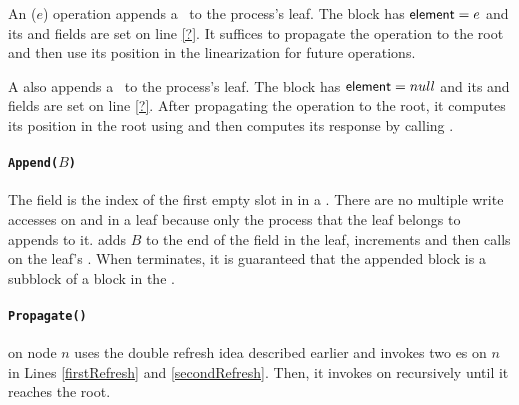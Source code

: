 An ($e$) operation appends a \block\ to the process's leaf.
The block has $\mbox{\sf element}=e$ and its  and  fields are set
on line \ref{?}.
It suffices to propagate the operation to the root and
then use its position in the linearization for future 
operations.

A  also appends a \block\ to the process's leaf.
The block has $\mbox{\sf element}=null$ and its  and  fields are set
on line \ref{?}.
After propagating the operation to the root, it computes
its position in the root using
 and then computes its response by calling . 

\paragraph{\tt{Append($B$)}}
The  field is the index of the first empty slot in
 in a . There are no multiple write accesses
on  and  in a leaf because only the process that
the leaf belongs to appends to it.  adds $B$ to the
end of the  field in the leaf, increments  and
then calls  on the leaf's . When
 terminates, it is guaranteed that the appended block is
a subblock of a block in the .  

\paragraph{\tt{Propagate()}}
 on node $n$ uses the double refresh idea described
earlier and invokes two es on $n$ in Lines
\ref{firstRefresh} and \ref{secondRefresh}. Then, it invokes
 on  recursively until it reaches the
root.  

